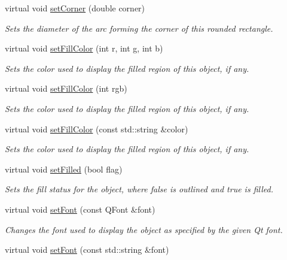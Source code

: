 \begin{DoxyCompactItemize}
virtual void \mbox{\hyperlink{classsgl_1_1GRoundRect_ab1cc6c77629d0e8ded56139a1866be48}{set\+Corner}} (double corner)
\begin{DoxyCompactList}\small\item\em Sets the diameter of the arc forming the corner of this rounded rectangle. \end{DoxyCompactList}\item 
virtual void \mbox{\hyperlink{classsgl_1_1GObject_ad767a33971159e9493e221cca4c00ae9}{set\+Fill\+Color}} (int r, int g, int b)
\begin{DoxyCompactList}\small\item\em Sets the color used to display the filled region of this object, if any. \end{DoxyCompactList}\item 
virtual void \mbox{\hyperlink{classsgl_1_1GObject_aa59d9775a67fa7df2b24a95cd34840a3}{set\+Fill\+Color}} (int rgb)
\begin{DoxyCompactList}\small\item\em Sets the color used to display the filled region of this object, if any. \end{DoxyCompactList}\item 
virtual void \mbox{\hyperlink{classsgl_1_1GObject_adbc18b1a930aadd97d7437f9f7265b96}{set\+Fill\+Color}} (const std\+::string \&color)
\begin{DoxyCompactList}\small\item\em Sets the color used to display the filled region of this object, if any. \end{DoxyCompactList}\item 
virtual void \mbox{\hyperlink{classsgl_1_1GObject_a9b82b53362282c6bb7d6947068d2e55b}{set\+Filled}} (bool flag)
\begin{DoxyCompactList}\small\item\em Sets the fill status for the object, where {\ttfamily false} is outlined and {\ttfamily true} is filled. \end{DoxyCompactList}\item 
virtual void \mbox{\hyperlink{classsgl_1_1GObject_a2592348886ffea646c6534bf88f7c49d}{set\+Font}} (const Q\+Font \&font)
\begin{DoxyCompactList}\small\item\em Changes the font used to display the object as specified by the given Qt font. \end{DoxyCompactList}\item 
virtual void \mbox{\hyperlink{classsgl_1_1GObject_a8e096e8818d838aceae1d46d58fb3a7b}{set\+Font}} (const std\+::string \&font)

\end{DoxyCompactItemize}
